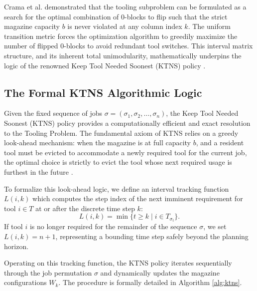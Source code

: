\documentclass[11pt, a4paper]{book}
\begin{document}
	Crama et al. \cite{Crama1994} demonstrated that the tooling subproblem can be formulated as a search for the optimal combination of 0-blocks to flip such that the strict magazine capacity $b$ is never violated at any column index $k$. The uniform transition metric forces the optimization algorithm to greedily maximize the number of flipped 0-blocks to avoid redundant tool switches. This interval matrix structure, and its inherent total unimodularity, mathematically underpins the logic of the renowned Keep Tool Needed Soonest (KTNS) policy \cite{Tang1988}.
	
	
	\subsection{The Formal KTNS Algorithmic Logic}
	
	Given the fixed sequence of jobs $\sigma = (\sigma_1, \sigma_2, \dots, \sigma_n)$, the Keep Tool Needed Soonest (KTNS) policy provides a computationally efficient and exact resolution to the Tooling Problem. The fundamental axiom of KTNS relies on a greedy look-ahead mechanism: when the magazine is at full capacity $b$, and a resident tool must be evicted to accommodate a newly required tool for the current job, the optimal choice is strictly to evict the tool whose next required usage is furthest in the future \cite{Tang1988}.
	
	To formalize this look-ahead logic, we define an interval tracking function $L(i, k)$ which computes the step index of the next imminent requirement for tool $i \in T$ at or after the discrete time step $k$:
	\begin{equation}
		L(i, k) = \min \{ t \ge k \mid i \in T_{\sigma_t} \}.
	\end{equation}
	If tool $i$ is no longer required for the remainder of the sequence $\sigma$, we set $L(i, k) = n + 1$, representing a bounding time step safely beyond the planning horizon.
	
	Operating on this tracking function, the KTNS policy iterates sequentially through the job permutation $\sigma$ and dynamically updates the magazine configurations $W_k$. The procedure is formally detailed in Algorithm \ref{alg:ktns}.
	
\end{document}
